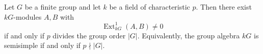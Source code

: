 Let $G$ be a finite group and let $k$ be a field of characteristic $p$. Then there exist $kG$-modules $A, B$ with
\[
\operatorname{Ext}_{kG}^1(A, B) \neq 0
\]
if and only if $p$ divides the group order $|G|$. Equivalently, the group algebra $kG$ is semisimple if and only if $p \nmid |G|$.

